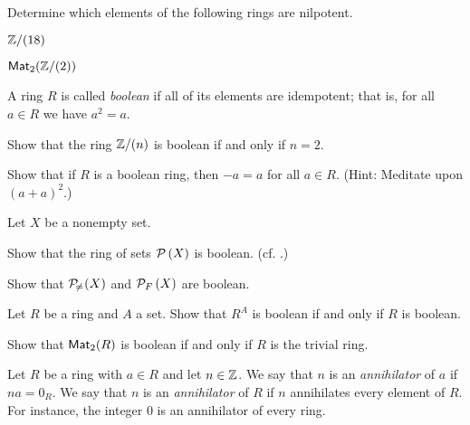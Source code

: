\begin{exercise}
Determine which elements of the following rings are nilpotent.
\begin{proplist*}
\item \(\mathbb{Z}/(18)\)
\item \(\mathsf{Mat}_{2}(\mathbb{Z}/(2))\)
\end{proplist*}
\end{exercise}

\begin{dfn} \label{dfn:boolean-ring}
A ring \(R\) is called \emph{boolean}  if all of its elements are idempotent; that is, for all \(a \in R\) we have \(a^2 = a\).
\end{dfn}

\begin{exercise}
Show that the ring \(\mathbb{Z}/(n)\) is boolean if and only if \(n = 2\).
\end{exercise}

\begin{exercise} \label{exerc:boolean-neg}
Show that if \(R\) is a boolean ring, then \(-a = a\) for all \(a \in R\).
(Hint: Meditate upon \((a+a)^2\).)
\end{exercise}

\begin{exercise}
Let \(X\) be a nonempty set.
\begin{proplist*}
\item Show that the ring of sets \(\mathcal{P}\left(X\right)\) is boolean.
(cf. .)
\item Show that \(\mathcal{P}_{\!\neq\!}\left(X\right)\) and \(\mathcal{P}_F\left(X\right)\) are boolean.
\end{proplist*}
\end{exercise}

\begin{exercise}
Let \(R\) be a ring and \(A\) a set.
Show that \(R^A\) is boolean if and only if \(R\) is boolean.
\end{exercise}

\begin{exercise}
Show that \(\mathsf{Mat}_{2}(R)\) is boolean if and only if \(R\) is the trivial ring.
\end{exercise}

\begin{dfn} \label{dfn:zz-annihilator}
Let \(R\) be a ring with \(a \in R\) and let \(n \in \mathbb{Z}\).
We say that \(n\) is an \emph{annihilator} of \(a\) if \(na = 0_R\).
We say that \(n\) is an \emph{annihilator}  of \(R\) if \(n\) annihilates every element of \(R\).
For instance, the integer 0 is an annihilator of every ring.
\end{dfn}


